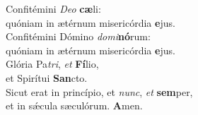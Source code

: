 \evenverse Confitémini \textit{De}\textit{o} \textbf{cæ}li:~\*\\
\evenverse quóniam in ætérnum misericórdia \textbf{e}jus.\\
\oddverse Confitémini Dómino \textit{do}\textit{mi}\textbf{nó}rum:~\*\\
\oddverse quóniam in ætérnum misericórdia \textbf{e}jus.\\
\evenverse Glória Pa\textit{tri}, \textit{et} \textbf{Fí}lio,~\*\\
\evenverse et Spirítui \textbf{San}cto.\\
\oddverse Sicut erat in princípio, et \textit{nunc}, \textit{et} \textbf{sem}per,~\*\\
\oddverse et in sǽcula sæculórum. \textbf{A}men.\\
